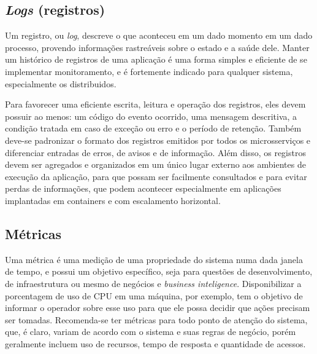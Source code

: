 
\subsection{\emph{Logs} (registros)}\label{subsecao-registros}

Um registro, ou \emph{log}, descreve o que aconteceu em um dado momento em um dado processo, provendo informações rastreáveis sobre o estado e a saúde dele. Manter um histórico de registros de uma aplicação é uma forma simples e eficiente de se implementar monitoramento, e é fortemente indicado para qualquer sistema, especialmente os distribuidos. 

Para favorecer uma eficiente escrita, leitura e operação dos registros, eles devem possuir ao menos: um código do evento ocorrido, uma mensagem descritiva, a condição tratada em caso de exceção ou erro e o período de retenção. Também deve-se padronizar o formato dos registros emitidos por todos os microsserviços e diferenciar entradas de erros, de avisos e de informação. Além disso, os registros devem ser agregados e organizados em um único lugar externo aos ambientes de execução da aplicação, para que possam ser facilmente consultados e para evitar perdas de informações, que podem acontecer especialmente em aplicações implantadas em containers e com escalamento horizontal. \cite{livro-sre-google-workbook}



\subsection{Métricas}
Uma métrica é uma medição de uma propriedade do sistema numa dada janela de tempo, e possui um objetivo específico, seja para questões de desenvolvimento, de infraestrutura ou mesmo de negócios e \emph{business inteligence}. Disponibilizar a porcentagem de uso de CPU em uma máquina, por exemplo, tem o objetivo de informar o operador sobre esse uso para que ele possa decidir que ações precisam ser tomadas. Recomenda-se ter métricas para todo ponto de atenção do sistema, que, é claro, variam de acordo com o sistema e suas regras de negócio, porém geralmente incluem uso de recursos, tempo de resposta e quantidade de acessos.


